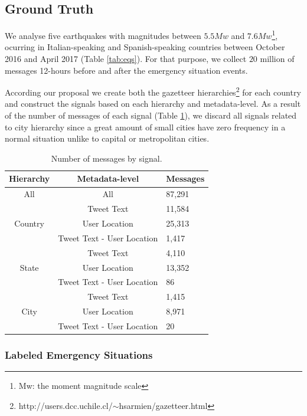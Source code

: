 \documentclass[sigconf]{acmart}
\begin{document}
\subsection{Ground Truth}

We analyse five earthquakes with magnitudes between $5.5Mw$ and $7.6Mw$\footnote{Mw: the moment magnitude scale}, ocurring in Italian-speaking and Spanish-speaking countries between October 2016 and April 2017 (Table \ref{tab:eqs}). For that purpose, we collect $20$ million of messages 12-hours before and after the emergency situation events. 

According our proposal we create both the gazetteer hierarchies\footnote{http://users.dcc.uchile.cl/$\sim$hsarmien/gazetteer.html} for each country and construct the signals based on each hierarchy and metadata-level. As a result of the number of messages of each signal (Table \ref{tab:message_signal}), we discard all signals related to city hierarchy since a great amount of small cities have zero frequency in a normal situation unlike to capital or metropolitan cities.




\begin{table}
	\caption{Number of messages by signal.}
	\label{tab:message_signal}
	\begin{tabular}{ccl}
		\toprule
		Hierarchy&Metadata-level&Messages\\
		\midrule
		All & All & 87,291 \\
		\midrule
	    \multirow{3}{*}{Country} & Tweet Text & 11,584 \\
	    & User Location & 25,313\\
	    & Tweet Text - User Location & 1,417\\	
		\bottomrule
		\multirow{3}{*}{State} & Tweet Text & 4,110 \\
		& User Location & 13,352\\
		& Tweet Text - User Location & 86\\
		\midrule
		\multirow{3}{*}{City} & Tweet Text & 1,415 \\
		& User Location & 8,971\\
		& Tweet Text - User Location & 20\\
		\bottomrule
	\end{tabular}
\end{table} 

\subsubsection{Labeled Emergency Situations}
\end{document}
